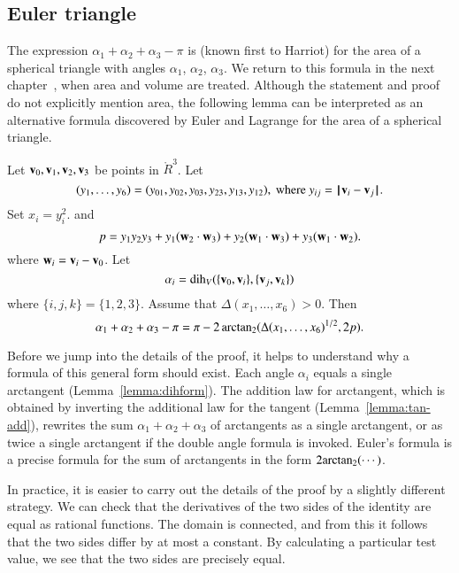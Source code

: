 \subsection{Euler triangle}

The expression $\alpha_1+\alpha_2+\alpha_3-\pi$ is  (known first to Harriot) for the area of a spherical
triangle with angles $\alpha_1$, $\alpha_2$, $\alpha_3$.  We return to
this formula in the next chapter~, when area and
volume are treated.  Although the statement and proof do
not explicitly mention area, the following lemma can be interpreted
as an alternative formula discovered by Euler and Lagrange for the
area of a spherical triangle.
%
%
%
%
%

\begin{lemma}\label{lemma:euler} %
Let ${\mathbf v}_0,{\mathbf v}_1,{\mathbf v}_2,{\mathbf v}_3$ be points in $\ring{R}^3$. 
Let 
\[ (y_1,\ldots,y_6)
  =(y_{01},y_{02},y_{03},y_{23},y_{13},y_{12}), \text{ where }
  y_{ij}=\norm{\v_i}{\v_j}.\]  Set $x_i = y_i^2$.  and
\[ 
p = y_1 y_2 y_3 + y_1 ({\mathbf w}_2\cdot {\mathbf w}_3) + y_2 ({\mathbf w}_1\cdot {\mathbf w}_3) + y_3
({\mathbf w}_1\cdot {\mathbf w}_2).
\] 
%
where ${\mathbf w}_i = {\mathbf v}_i- {\mathbf v}_0$.  Let \[ \alpha_i
  =\operatorname{dih}_V(\{{\mathbf v}_0,{\mathbf v}_i\},\{{\mathbf v}_j,{\mathbf v}_k\})\] 
where $\{i,j,k\}=\{1,2,3\}$.
Assume that $\Delta(x_1,\ldots,x_6)>0$. 
Then
\[ 
\alpha_1+\alpha_2+\alpha_3 - \pi
= {\pi} - 2\,{\operatorname{arctan_2}}({\Delta(x_1,\ldots,x_6)^{1/2}},{2 p}).
\] 
\end{lemma}
%


Before we jump into the details of the proof, it helps to understand
why a formula of this general form should exist.  
Each angle $\alpha_i$ equals a single arctangent (Lemma~\ref{lemma:dihform}).
The addition law for arctangent, which is obtained by inverting the additional law for
the tangent (Lemma~\ref{lemma:tan-add}),
rewrites the sum $\alpha_1+\alpha_2+\alpha_3$
of arctangents as a single arctangent, or as twice a single arctangent if
the double angle formula is invoked.  Euler's formula is a precise formula for the
sum of arctangents in the form $2{\operatorname{arctan_2}}(\cdots)$.

In practice, it is easier to carry out the details of the proof by a
slightly different strategy.  We can check that the derivatives of the
two sides of the identity are equal as rational functions.  The domain
is connected, and from this it follows that the two sides differ by at
most a constant.  By calculating a particular test value, we see that
the two sides are precisely equal.



